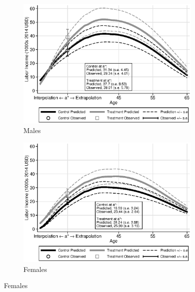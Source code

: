 \begin{figure}
\centering
\caption{Predicted Labor Income Profiles for ABC/CARE Participants}\label{fig:labor-income-profiles}
\begin{subfigure}[h]{0.5\textwidth}
		\centering
		\caption{Males} \label{fig:labor-income-profilesc}
		\includegraphics[width=\textwidth]{output/labor_25-65_pset1_mset1_male.eps}
\end{subfigure}%
\begin{subfigure}[h]{0.5\textwidth}
		\centering
		\caption{Females} \label{fig:labor-income-profilesa}
		\includegraphics[width=\textwidth]{output/labor_25-65_pset1_mset1_female.eps}
\end{subfigure}
\footnotesize \justify

\end{figure}
